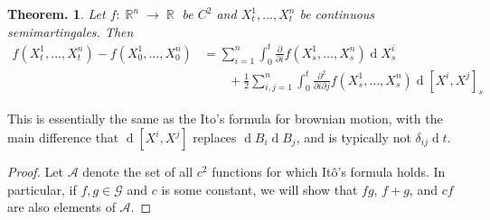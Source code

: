 \documentclass[11pt, a4paper]{memoir}
\DeclareMathOperator{\R}{{\mathbb{R}}}
\newcommand{\agspace}{\ensuremath{\phantom{--}}}
\theoremstyle{change}
\newtheorem{theorem}{Theorem.}[section]
\theoremstyle{plain}
\theoremstyle{nonumberplain}
\newtheorem{proof}{Proof}
\renewcommand{\d}[1]{\ensuremath{\operatorname{d}\!{#1}}}
\numberwithin{equation}{section}
\begin{document}
\begin{theorem}
    Let $f:\R^n\to\R$ be $C^2$ and $X_t^1,\ldots,X_t^n$ be continuous semimartingales.
    Then
    \begin{align*}
        f(X_t^1,\ldots,X_t^n)-f(X_0^1,\ldots,X_0^n) &= \sum_{i=1}^n\int_0^t\frac{\partial}{\partial i}f(X_s^1,\ldots,X_s^n)\d{X_s^i}\\
                                                    &\agspace+\frac{1}{2}\sum_{i,j=1}^n\int_0^t\frac{\partial^2}{\partial i\partial j}f(X_s^1,\ldots,X_s^n)\d{[X^i,X^j]_s}
    \end{align*}
\end{theorem}
This is essentially the same as the Ito's formula for brownian motion, with the main difference that $\d{[X^i,X^j]}$ replaces $\d{B_i}\d{B_j}$, and is typically not $\delta_{ij}\d{t}$.
\begin{proof}
    Let $\mathcal{A}$ denote the set of all $c^2$ functions for which Itô's formula holds.
    In particular, if $f,g\in\mathcal{G}$ and $c$ is some constant, we will show that $fg$, $f+g$, and $cf$ are also elements of $\mathcal{A}$.


\end{proof}
\end{document}
